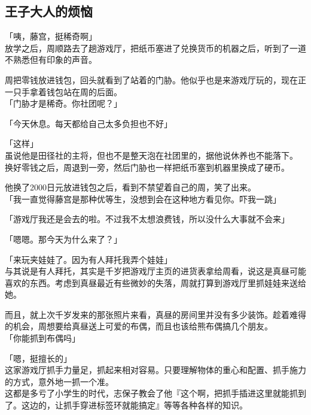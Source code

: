 \subsection{王子大人的烦恼}

「咦，藤宫，挺稀奇啊」\\

放学之后，周顺路去了趟游戏厅，把纸币塞进了兑换货币的机器之后，听到了一道不熟悉但有印象的声音。

周把零钱放进钱包，回头就看到了站着的门胁。他似乎也是来游戏厅玩的，现在正一只手拿着钱包站在周的后面。\\

「门胁才是稀奇。你社团呢？」

「今天休息。每天都给自己太多负担也不好」

「这样」\\

虽说他是田径社的主将，但也不是整天泡在社团里的，据他说休养也不能落下。\\

换好零钱之后，周退到一旁，然后门胁也一样把纸币塞到机器里换成了硬币。

他换了2000日元放进钱包之后，看到不禁望着自己的周，笑了出来。\\

「我一直觉得藤宫是那种优等生，没想到会在这种地方看见你。吓我一跳」

「游戏厅我还是会去的啦。不过我不太想浪费钱，所以没什么大事就不会来」

「嗯嗯。那今天为什么来了？」

「来玩夹娃娃了。因为有人拜托我弄个娃娃」\\

与其说是有人拜托，其实是千岁把游戏厅主页的进货表拿给周看，说这是真昼可能喜欢的东西。考虑到真昼最近有些微妙的失落，周就打算到游戏厅里抓娃娃来送给她。

而且，就上次千岁发来的那张照片来看，真昼的房间里并没有多少装饰。趁着难得的机会，周想要给真昼送上可爱的布偶，而且也该给熊布偶搞几个朋友。\\

「你能抓到布偶吗」

「嗯，挺擅长的」\\

这家游戏厅抓手力量足，抓起来相对容易。只要理解物体的重心和配置、抓手施力的方式，意外地一抓一个准。\\

这都是多亏了小学生的时代，志保子教会了他『这个啊，把抓手插进这里就能抓到了。这边的，让抓手穿进标签环就能搞定』等等各种各样的知识。


